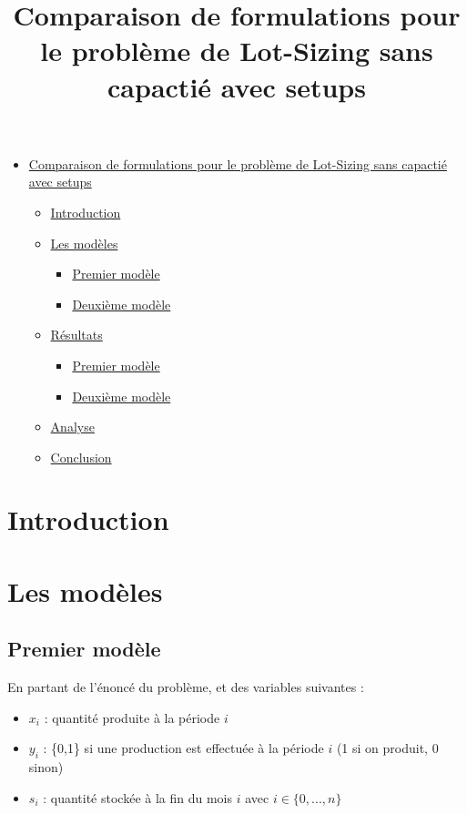 \documentclass[10pt]{article}
\title{Comparaison de formulations pour le problème de Lot-Sizing sans capactié avec setups}
\author{}
\date{}
\begin{document}
\maketitle
\begin{itemize}
  \item \href{#comparaison-de-formulations-pour-le-probl%C3%A8me-de-lot-sizing-sans-capacti%C3%A9-avec-setups}{Comparaison de formulations pour le problème de Lot-Sizing sans capactié avec setups}
  \begin{itemize}
    \item \href{#introduction}{Introduction}
    \item \href{#les-mod%C3%A8les}{Les modèles}
    \begin{itemize}
      \item \href{#premier-mod%C3%A8le}{Premier modèle}
      \item \href{#deuxi%C3%A8me-mod%C3%A8le}{Deuxième modèle}
    \end{itemize}
    \item \href{#r%C3%A9sultats}{Résultats}
    \begin{itemize}
      \item \href{#premier-mod%C3%A8le-1}{Premier modèle}
      \item \href{#deuxi%C3%A8me-mod%C3%A8le-1}{Deuxième modèle}
    \end{itemize}
    \item \href{#analyse}{Analyse}
    \item \href{#conclusion}{Conclusion}
  \end{itemize}
\end{itemize}

\section*{Introduction}

\section*{Les modèles}

\subsection*{Premier modèle}
En partant de l'énoncé du problème, et des variables suivantes :

\begin{itemize}
  \item $x_{i}$ : quantité produite à la période $i$
  \item $y_{i}$ : \{0,1\} si une production est effectuée à la période $i$ (1 si on produit, 0 sinon)
  \item $s_{i}$ : quantité stockée à la fin du mois $i$
avec $i \in \{0,..., n\}$
\end{itemize}
\end{document}
